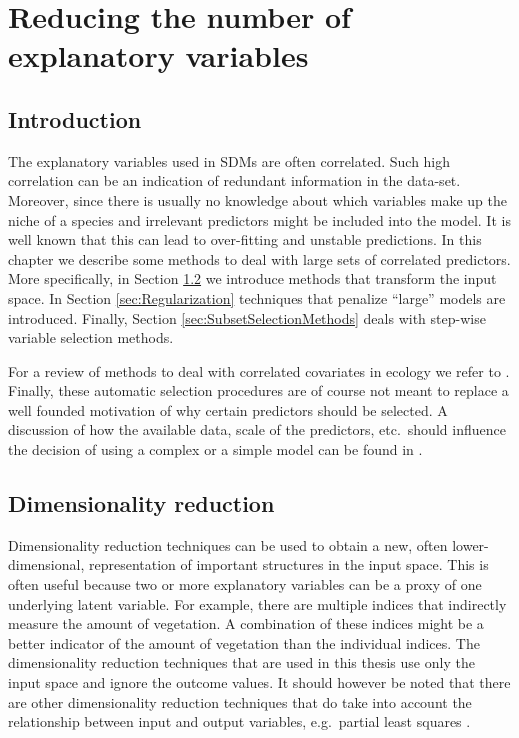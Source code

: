 \chapter{Reducing the number of explanatory variables}
\label{ch:ReducingTheNumberOfExplanatoryVariables}

\section{Introduction}
The explanatory variables used in SDMs are often correlated. Such high correlation can be an indication of redundant information in the data-set. Moreover, since there is usually no knowledge about which variables make up the niche of a species and irrelevant predictors might be included into the model. It is well known that this can lead to over-fitting and unstable predictions. In this chapter we describe some methods to deal with large sets of correlated predictors. More specifically, in Section \ref{sec:DimensionalityReduction} we introduce methods that transform the input space. In Section \ref{sec:Regularization} techniques that penalize ``large'' models are introduced. Finally, Section \ref{sec:SubsetSelectionMethods} deals with step-wise variable selection methods.


For a review of methods to deal with correlated covariates in ecology we refer to \cite{dormann_collinearity:_2013}. Finally, these automatic selection procedures are of course not meant to replace a well founded motivation of why certain predictors should be selected. A discussion of how the available data, scale of the predictors, etc.\ should influence the decision of using a complex or a simple model can be found in \cite{merow_what_2014}.

\section{Dimensionality reduction}
\label{sec:DimensionalityReduction}
Dimensionality reduction techniques can be used to obtain a new, often lower-dimensional, representation of important structures in the input space. This is often useful because two or more explanatory variables can be a proxy of one underlying latent variable. For example, there are multiple indices that indirectly measure the amount of vegetation. A combination of these indices might be a better indicator of the amount of vegetation than the individual indices. The dimensionality reduction techniques that are used in this thesis use only the input space and ignore the outcome values. It should however be noted that there are other dimensionality reduction techniques that do take into account the relationship between input and output variables, e.g.\ partial least squares \parencite[see e.g.][]{marx_iteratively_1996}.

